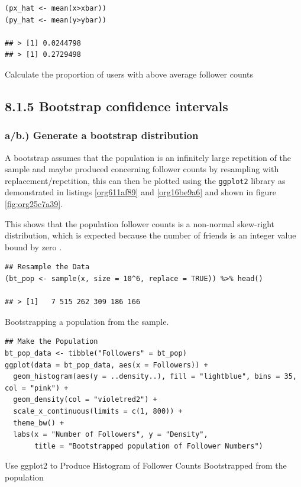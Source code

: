 \documentclass[11pt]{article}
\begin{document}
\begin{listing}[htbp]
\begin{verbatim}
(px_hat <- mean(x>xbar))
(py_hat <- mean(y>ybar))

## > [1] 0.0244798
## > [1] 0.2729498
\end{verbatim}
\caption{\label{orge18d6af}Calculate the proportion of users with above average follower counts}
\end{listing}


\subsection{8.1.5 Bootstrap confidence intervals}
\label{sec:org8d919db}
\subsubsection{a/b.) Generate a bootstrap distribution}
\label{sec:orgb15342d}

A bootstrap assumes that the population is an infinitely large repetition of the
sample and maybe produced concerning follower counts by resampling with
replacement/repetition, this can then be plotted using the \texttt{ggplot2} library as demonstrated
in listings \ref{org611af89} and \ref{org16be9a6} and shown in figure \ref{fig:org25c7a39}.

This shows that the population follower counts is a non-normal skew-right
distribution, which is expected because the number of friends is an integer value bound by zero \cite{nist2013}.

\begin{listing}[htbp]
\begin{verbatim}
## Resample the Data
(bt_pop <- sample(x, size = 10^6, replace = TRUE)) %>% head()

## > [1]   7 515 262 309 186 166
\end{verbatim}
\caption{\label{org611af89}Bootstrapping a population from the sample.}
\end{listing}

\begin{listing}[htbp]
\begin{verbatim}
## Make the Population
bt_pop_data <- tibble("Followers" = bt_pop)
ggplot(data = bt_pop_data, aes(x = Followers)) +
  geom_histogram(aes(y = ..density..), fill = "lightblue", bins = 35, col = "pink") +
  geom_density(col = "violetred2") +
  scale_x_continuous(limits = c(1, 800)) +
  theme_bw() +
  labs(x = "Number of Followers", y = "Density",
       title = "Bootstrapped population of Follower Numbers")

\end{verbatim}
\caption{\label{org16be9a6}Use ggplot2 to Produce Histogram of Follower Counts Bootstrapped from the population}
\end{listing}
\end{document}
